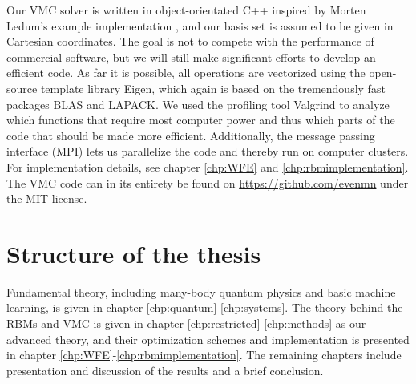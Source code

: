 Our VMC solver is written in object-orientated C++ inspired by Morten Ledum's example implementation \cite{ledum_simple_2016}, and our basis set is assumed to be given in Cartesian coordinates. The goal is not to compete with the performance of commercial software, but we will still make significant efforts to develop an efficient code. As far it is possible, all operations are vectorized using the open-source template library Eigen, which again is based on the tremendously fast packages BLAS and LAPACK. We used the profiling tool Valgrind to analyze which functions that require most computer power and thus which parts of the code that should be made more efficient. Additionally, the message passing interface (MPI) lets us parallelize the code and thereby run on computer clusters. For implementation details, see chapter \ref{chp:WFE} and \ref{chp:rbmimplementation}. The VMC code can in its entirety be found on \url{https://github.com/evenmn} under the MIT license. 

\section{Structure of the thesis}
Fundamental theory, including many-body quantum physics and basic machine learning, is given in chapter \ref{chp:quantum}-\ref{chp:systems}. The theory behind the RBMs and VMC is given in chapter \ref{chp:restricted}-\ref{chp:methods} as our advanced theory, and their optimization schemes and implementation is presented in chapter \ref{chp:WFE}-\ref{chp:rbmimplementation}. The remaining chapters include presentation and discussion of the results and a brief conclusion.

